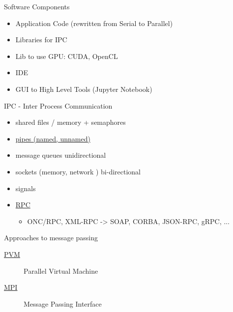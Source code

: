 \documentclass[ignorenonframetext,]{beamer}
\providecommand{\tightlist}{%
  \setlength{\itemsep}{0pt}\setlength{\parskip}{0pt}}
\begin{document}
\begin{frame}{Software Components}

\begin{itemize}
\tightlist
\item
  Application Code (rewritten from Serial to Parallel)
\item
  Libraries for IPC
\item
  Lib to use GPU: CUDA, OpenCL
\item
  IDE
\item
  GUI to High Level Tools (Jupyter Notebook)
\end{itemize}

\end{frame}

\begin{frame}{IPC - Inter Process Communication}

\begin{itemize}
\tightlist
\item
  shared files / memory + semaphores
\item
  \href{https://opensource.com/article/19/4/interprocess-communication-linux-channels}{pipes
  (named, unnamed)}
\item
  message queues unidirectional
\item
  sockets (memory, network ) bi-directional
\item
  signals
\item
  \href{https://en.wikipedia.org/wiki/Remote_procedure_call}{RPC}

  \begin{itemize}
  \tightlist
  \item
    ONC/RPC, XML-RPC -\textgreater{} SOAP, CORBA, JSON-RPC, gRPC, ...
  \end{itemize}

\end{itemize}


\end{frame}

\begin{frame}{Approaches to message passing}

\begin{description}
\item[\href{https://en.wikipedia.org/wiki/Parallel_Virtual_Machine}{PVM}]
Parallel Virtual Machine
\item[\href{https://tinyurl.com/6mfo5pf}{MPI}]
Message Passing Interface
\end{description}

\end{frame}
\end{document}
